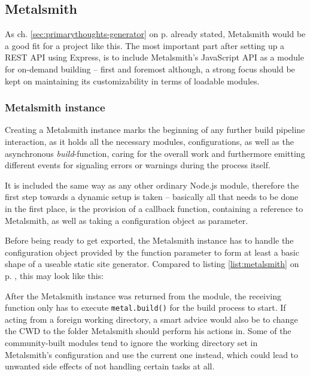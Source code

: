 \subsection{Metalsmith}
\label{sec:foundation-metalsmith}

As ch. \ref{sec:primarythoughts-generator} on p. \pageref{sec:primarythoughts-generator} already stated, Metalsmith would be a good fit for a project like this. The most important part after setting up a REST API using Express, is to include Metalsmith's JavaScript API as a module for on-demand building -- first and foremost although, a strong focus should be kept on maintaining its customizability in terms of loadable modules.

\subsubsection{Metalsmith instance}
Creating a Metalsmith instance marks the beginning of any further build pipeline interaction, as it holds all the necessary modules, configurations, as well as the asynchronous \emph{build}-function, caring for the overall work and furthermore emitting different events for signaling errors or warnings during the process itself.

It is included the same way as any other ordinary Node.js module, therefore the first step towards a dynamic setup is taken -- basically all that needs to be done in the first place, is the provision of a callback function, containing a reference to Metalsmith, as well as taking a configuration object as parameter.

Before being ready to get exported, the Metalsmith instance has to handle the configuration object provided by the function parameter to form at least a basic shape of a useable static site generator. Compared to listing \ref{list:metalsmith} on p. \pageref{list:metalsmith}, this may look like this:



After the Metalsmith instance was returned from the module, the receiving function only has to execute \texttt{metal.build()} for the build process to start. If acting from a foreign working directory, a smart advice would also be to change the CWD to the folder Metalsmith should perform his actions in. Some of the community-built modules tend to ignore the working directory set in Metalsmith's configuration and use the current one instead, which could lead to unwanted side effects of not handling certain tasks at all.

